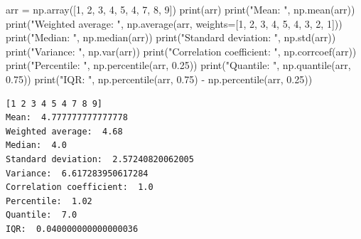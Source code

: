 \documentclass[
  letterpaper,
  DIV=11,
  numbers=noendperiod]{scrreprt}
\newenvironment{Shaded}{\begin{snugshade}}{\end{snugshade}}
\newcommand{\BuiltInTok}[1]{\textcolor[rgb]{0.00,0.23,0.31}{#1}}
\newcommand{\DecValTok}[1]{\textcolor[rgb]{0.68,0.00,0.00}{#1}}
\newcommand{\FloatTok}[1]{\textcolor[rgb]{0.68,0.00,0.00}{#1}}
\newcommand{\NormalTok}[1]{\textcolor[rgb]{0.00,0.23,0.31}{#1}}
\newcommand{\OperatorTok}[1]{\textcolor[rgb]{0.37,0.37,0.37}{#1}}
\newcommand{\StringTok}[1]{\textcolor[rgb]{0.13,0.47,0.30}{#1}}
\begin{document}
\begin{Shaded}
\begin{Highlighting}[]
\NormalTok{arr }\OperatorTok{=}\NormalTok{ np.array([}\DecValTok{1}\NormalTok{, }\DecValTok{2}\NormalTok{, }\DecValTok{3}\NormalTok{, }\DecValTok{4}\NormalTok{, }\DecValTok{5}\NormalTok{, }\DecValTok{4}\NormalTok{, }\DecValTok{7}\NormalTok{, }\DecValTok{8}\NormalTok{, }\DecValTok{9}\NormalTok{])}
\BuiltInTok{print}\NormalTok{(arr)}
\BuiltInTok{print}\NormalTok{(}\StringTok{"Mean: "}\NormalTok{, np.mean(arr))}
\BuiltInTok{print}\NormalTok{(}\StringTok{"Weighted average: "}\NormalTok{, np.average(arr, weights}\OperatorTok{=}\NormalTok{[}\DecValTok{1}\NormalTok{, }\DecValTok{2}\NormalTok{, }\DecValTok{3}\NormalTok{, }\DecValTok{4}\NormalTok{, }\DecValTok{5}\NormalTok{, }\DecValTok{4}\NormalTok{, }\DecValTok{3}\NormalTok{, }\DecValTok{2}\NormalTok{, }\DecValTok{1}\NormalTok{]))}
\BuiltInTok{print}\NormalTok{(}\StringTok{"Median: "}\NormalTok{, np.median(arr))}
\BuiltInTok{print}\NormalTok{(}\StringTok{"Standard deviation: "}\NormalTok{, np.std(arr))}
\BuiltInTok{print}\NormalTok{(}\StringTok{"Variance: "}\NormalTok{, np.var(arr))}
\BuiltInTok{print}\NormalTok{(}\StringTok{"Correlation coefficient: "}\NormalTok{, np.corrcoef(arr))}
\BuiltInTok{print}\NormalTok{(}\StringTok{"Percentile: "}\NormalTok{, np.percentile(arr, }\FloatTok{0.25}\NormalTok{))}
\BuiltInTok{print}\NormalTok{(}\StringTok{"Quantile: "}\NormalTok{, np.quantile(arr, }\FloatTok{0.75}\NormalTok{))}
\BuiltInTok{print}\NormalTok{(}\StringTok{"IQR: "}\NormalTok{, np.percentile(arr, }\FloatTok{0.75}\NormalTok{) }\OperatorTok{{-}}\NormalTok{ np.percentile(arr, }\FloatTok{0.25}\NormalTok{))}
\end{Highlighting}
\end{Shaded}

\begin{verbatim}
[1 2 3 4 5 4 7 8 9]
Mean:  4.777777777777778
Weighted average:  4.68
Median:  4.0
Standard deviation:  2.57240820062005
Variance:  6.617283950617284
Correlation coefficient:  1.0
Percentile:  1.02
Quantile:  7.0
IQR:  0.040000000000000036
\end{verbatim}
\end{document}
